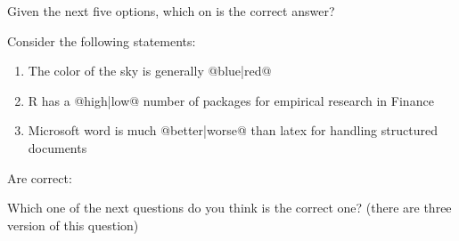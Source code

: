 \documentclass[10pt]{examdesign}
\begin{document}
\vspace{1cm}

\begin{multiplechoice}[resetcounter=no,  examcolumns=1]

\begin{question}
	
	Given the next five options, which on is the correct answer?
	
	
	
	
	
	
\end{question}

\begin{question}
	
	Consider the following statements:
	
	\begin{enumerate}[I]
		\item The color of the sky is generally @{blue}|{red}@
		
		\item R has a @{high}|{low}@ number of packages for empirical research in Finance
		
		\item Microsoft word is much @{better}|{worse}@ than latex for handling structured documents
	\end{enumerate}
	
	Are correct:

	
	
	
	
	
\end{question}


\begin{question}
	
	Which one of the next questions do you think is the correct one? (there are three version of this question)
	
	
	
	

\end{question}
\end{multiplechoice}
\end{document}
